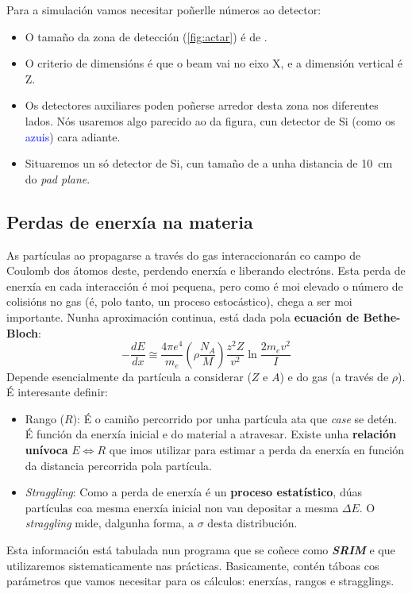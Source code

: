 \documentclass[11pt, a4paper]{article}
\begin{document}
Para a simulación vamos necesitar poñerlle números ao detector:
\begin{itemize}
    \item O tamaño da zona de detección (\autoref{fig:actar}) é de .
    \item O criterio de dimensións é que o beam vai no eixo X, e a dimensión vertical é Z.
    \item Os detectores auxiliares poden poñerse arredor desta zona nos diferentes lados. Nós usaremos algo parecido ao da figura, cun detector de Si (como os \textcolor{blue}{azuis}) cara adiante.
    \item Situaremos un só detector de Si, cun tamaño de  a unha distancia de \qty{10}{\cm} do \textit{pad plane}.
\end{itemize}

\subsection{Perdas de enerxía na materia}\label{sec:de}
As partículas ao propagarse a través do gas interaccionarán co campo de Coulomb dos átomos deste, perdendo enerxía e liberando electróns. Esta perda de enerxía en cada interacción é moi pequena, pero como é moi elevado o número de colisións no gas (é, polo tanto, un proceso estocástico), chega a ser moi importante. Nunha aproximación continua, está dada pola \textbf{ecuación de Bethe-Bloch}:
\begin{equation*}\label{eq:stopping}
    - \frac{dE}{dx} \cong \frac{4 \pi e^4}{m_e} \left(\rho \frac{N_A}{M}\right)\frac{z^2 Z}{v^2} \ln{\frac{2m_e v^2}{I}}
\end{equation*}
Depende esencialmente da partícula a considerar ($Z$ e $A$) e do gas (a través de $\rho$). É interesante definir:
\begin{itemize}
    \item Rango ($R$): É o camiño percorrido por unha partícula ata que \textit{case} se detén. É función da enerxía inicial e do material a atravesar. Existe unha \textbf{relación unívoca} $E \Longleftrightarrow R$ que imos utilizar para estimar a perda da enerxía en función da distancia percorrida pola partícula.
    \item \textit{Straggling}: Como a perda de enerxía é un \textbf{proceso estatístico}, dúas partículas coa mesma enerxía inicial non van depositar a mesma $\Delta E$. O \textit{straggling} mide, dalgunha forma, a $\sigma$ desta distribución.
\end{itemize}
Esta información está tabulada nun programa que se coñece como \textit{\textbf{SRIM}} e que utilizaremos sistematicamente nas prácticas. Basicamente, contén táboas cos parámetros que vamos necesitar para os cálculos: enerxías, rangos e stragglings.
\end{document}
